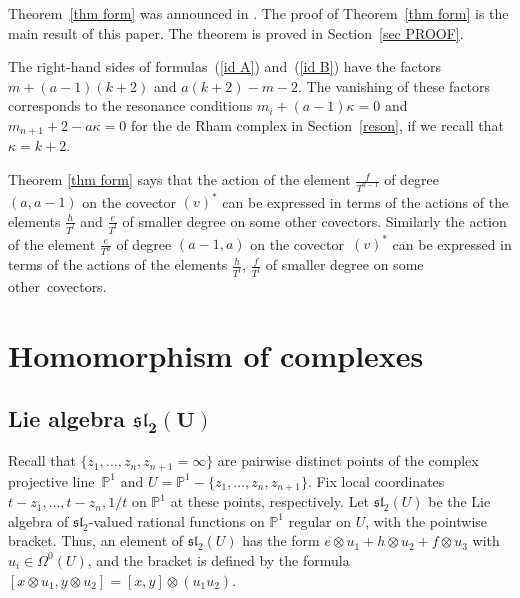 \documentclass[11pt]{article}
\numberwithin{equation}{section}
\begin{document}
Theorem~\ref{thm form} was announced in \cite{SV2}. The proof of Theorem~\ref{thm form} is the main result of this paper. The theorem is proved in Section~\ref{sec PROOF}.

\begin{rem} The right-hand sides of formulas~(\ref{id A}) and~(\ref{id B}) have the factors $m+(a-1)(k+2)$ and $a(k+2)-m-2$. The vanishing of these factors corresponds to the resonance conditions $m_i+(a-1)\kappa=0$ and $m_{n+1}+2-a\kappa=0$ for the de Rham complex in Section~\ref{reson}, if we recall that $\kappa=k+2$.
\end{rem}

\begin{rem}Theorem \ref{thm form} says that the action of the element $\frac{f}{T^{a-1}}$ of degree $(a,a-1)$ on the covector $(v)^*$ can be expressed in terms of the actions of the elements $\frac{h}{T^{l}}$ and $\frac{e}{T^{l}}$ of smaller degree on some other covectors. Similarly the action of the element $\frac{e}{T^{a}}$ of degree $(a-1,a)$ on the covector~$(v)^*$ can be expressed in terms of the actions of the elements $\frac{h}{T^{l}}$, $\frac{f}{T^{l}}$ of smaller degree on some other~covectors.
\end{rem}


\setcounter{section}{3}
\setcounter{subsection}{8}
\setcounter{subsubsection}{0}
\setcounter{thm}{3}
\setcounter{equation}{3}
\section{Homomorphism of complexes}\label{sec homs}

\subsection[Lie algebra $\mathfrak{sl}_2(U)$]{Lie algebra $\boldsymbol{\mathfrak{sl}_2(U)}$}\label{conf block}
Recall that $\{z_1,\dots,z_n,z_{n+1}=\infty\}$ are pairwise distinct points of the complex projective line~${\mathbb P}^1$ and $U={\mathbb P}^1 -\{z_1,\dots,z_n,z_{n+1}\}$. Fix local coordinates $t-z_1,\dots, t-z_n,1/t$ on ${\mathbb P}^1$ at these points, respectively.
Let $\mathfrak{sl}_2(U)$ be the Lie algebra of $\mathfrak{sl}_2$-valued rational functions on ${\mathbb P}^1$ regular on $U$, with the pointwise bracket. Thus, an element of $\mathfrak{sl}_2(U)$ has the form $e\otimes u_1 + h\otimes u_2+ f\otimes u_3$ with $u_i\in\Omega^0(U)$, and the bracket is defined by the formula $[x\otimes u_1, y\otimes u_2] = [x,y]\otimes (u_1u_2)$.
\end{document}
